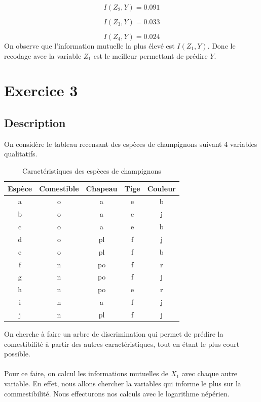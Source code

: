 \documentclass{article}
\begin{document}
\[
I(Z_2,Y) = 0.091
\]

\[
I(Z_3,Y) = 0.033
\]

\[
I(Z_4,Y) = 0.024
\]
On observe que l'information mutuelle la plus élevé est $I(Z_1,Y)$. Donc le recodage avec la variable $Z_1$ est le meilleur permettant de prédire $Y$.


\newpage
\section{Exercice 3}
\label{exercice3}
\subsection{Description}

On considère le tableau recensant des espèces de champignons suivant 4 variables qualitatifs. 

\begin{table}[h]
  \centering
  \caption{Caractéristiques des espèces de champignons}
  \begin{tabular}{@{}ccccc@{}}
  \toprule
  Espèce & Comestible & Chapeau & Tige & Couleur \\ \midrule
  a      & o          & a       & e    & b       \\
  b      & o          & a       & e    & j       \\
  c      & o          & a       & e    & b       \\
  d      & o          & pl      & f    & j       \\
  e      & o          & pl      & f    & b       \\
  f      & n          & po      & f    & r       \\
  g      & n          & po      & f    & j       \\
  h      & n          & po      & e    & r       \\
  i      & n          & a       & f    & j       \\
  j      & n          & pl      & f    & j       \\ \bottomrule
  \end{tabular}
  
  \label{tab:champignons}
  \end{table}

  On cherche à faire un arbre de discrimination qui permet de prédire la comestibilité à partir des autres caractéristiques, tout en étant le plus court possible.
  \\
  \\
  Pour ce faire, on calcul les informations mutuelles de $X_1$ avec chaque autre variable.
  En effet, nous allons chercher la variables qui informe le plus sur la commestibilité. Nous effecturons nos calculs avec le logarithme népérien.
\end{document}
